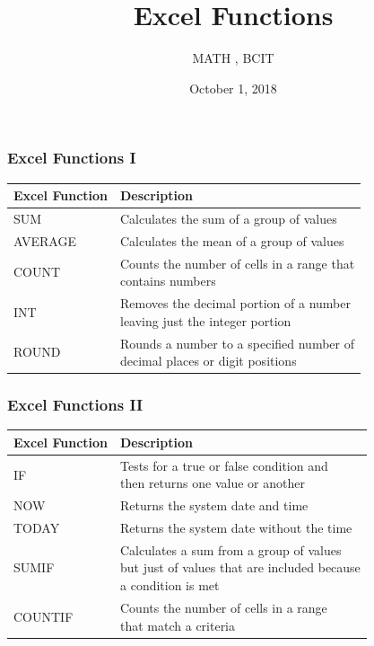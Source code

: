 \documentclass[xcolor=dvipsnames]{beamer}
\title{Excel Functions}
\subtitle{MATH {\CourseNumber}, BCIT}
\author{\CourseName}
\date{October 1, 2018}
\begin{document}
\begin{frame}
  \titlepage
\end{frame}

\begin{frame}
  \frametitle{Excel Functions I}
  \begin{tabular}{|l|l|}\hline
    \textbf{Excel Function} & \textbf{Description}                                                                                             \\ \hline
    SUM            & Calculates the sum of a group of values                                                                 \\ \hline
    AVERAGE        & Calculates the mean of a group of values                                                                \\ \hline
    COUNT          & \specialcell[t]{Counts the number of cells in a range that\\contains numbers}                                             \\ \hline
    INT            & \specialcell[t]{Removes the decimal portion of a number\\leaving just the integer portion}                                \\ \hline
    ROUND          & \specialcell[t]{Rounds a number to a specified number of\\decimal places or digit positions}                              \\ \hline
  \end{tabular}
\end{frame}

\begin{frame}
  \frametitle{Excel Functions II}
  \begin{tabular}{|l|l|}\hline
    \textbf{Excel Function} & \textbf{Description}                                                                                             \\ \hline
    IF             & \specialcell[t]{Tests for a true or false condition and\\then returns one value or another}                               \\ \hline
    NOW            & Returns the system date and time                                                                        \\ \hline
    TODAY          & Returns the system date without the time                                                                \\ \hline
    SUMIF          & \specialcell[t]{Calculates a sum from a group of values\\but just of values that are included because\\a condition is met} \\ \hline
    COUNTIF        & \specialcell[t]{Counts the number of cells in a range\\that match a criteria}                                             \\ \hline
  \end{tabular}
\end{frame}
\end{document}
